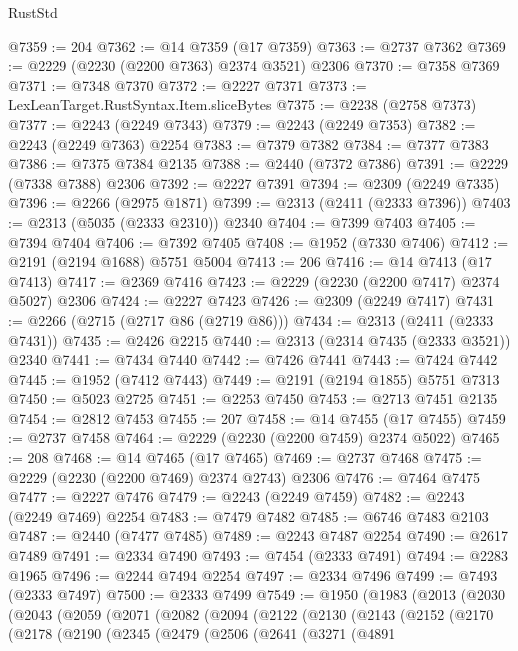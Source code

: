 \begin{lexlean}{RustStd}
\begin{coremodule}
{\begin{coremodule}
{{{{{{{{{{{{{{{{{{{{{{{{{{{{{{{{{{@7359 := 204
@7362 := @14 @7359 (@17 @7359)
@7363 := @2737 @7362
@7369 := @2229 (@2230 (@2200 @7363) @2374 @3521) @2306
@7370 := @7358 @7369
@7371 := @7348 @7370
@7372 := @2227 @7371
@7373 := LexLeanTarget.RustSyntax.Item.sliceBytes
@7375 := @2238 (@2758 @7373)
@7377 := @2243 (@2249 @7343)
@7379 := @2243 (@2249 @7353)
@7382 := @2243 (@2249 @7363) @2254
@7383 := @7379 @7382
@7384 := @7377 @7383
@7386 := @7375 @7384 @2135
@7388 := @2440 (@7372 @7386)
@7391 := @2229 (@7338 @7388) @2306
@7392 := @2227 @7391
@7394 := @2309 (@2249 @7335)
@7396 := @2266 (@2975 @1871)
@7399 := @2313 (@2411 (@2333 @7396))
@7403 := @2313 (@5035 (@2333 @2310)) @2340
@7404 := @7399 @7403
@7405 := @7394 @7404
@7406 := @7392 @7405
@7408 := @1952 (@7330 @7406)
@7412 := @2191 (@2194 @1688) @5751 @5004
@7413 := 206
@7416 := @14 @7413 (@17 @7413)
@7417 := @2369 @7416
@7423 := @2229 (@2230 (@2200 @7417) @2374 @5027) @2306
@7424 := @2227 @7423
@7426 := @2309 (@2249 @7417)
@7431 := @2266 (@2715 (@2717 @86 (@2719 @86)))
@7434 := @2313 (@2411 (@2333 @7431))
@7435 := @2426 @2215
@7440 := @2313 (@2314 @7435 (@2333 @3521)) @2340
@7441 := @7434 @7440
@7442 := @7426 @7441
@7443 := @7424 @7442
@7445 := @1952 (@7412 @7443)
@7449 := @2191 (@2194 @1855) @5751 @7313
@7450 := @5023 @2725
@7451 := @2253 @7450
@7453 := @2713 @7451 @2135
@7454 := @2812 @7453
@7455 := 207
@7458 := @14 @7455 (@17 @7455)
@7459 := @2737 @7458
@7464 := @2229 (@2230 (@2200 @7459) @2374 @5022)
@7465 := 208
@7468 := @14 @7465 (@17 @7465)
@7469 := @2737 @7468
@7475 := @2229 (@2230 (@2200 @7469) @2374 @2743) @2306
@7476 := @7464 @7475
@7477 := @2227 @7476
@7479 := @2243 (@2249 @7459)
@7482 := @2243 (@2249 @7469) @2254
@7483 := @7479 @7482
@7485 := @6746 @7483 @2103
@7487 := @2440 (@7477 @7485)
@7489 := @2243 @7487 @2254
@7490 := @2617 @7489
@7491 := @2334 @7490
@7493 := @7454 (@2333 @7491)
@7494 := @2283 @1965
@7496 := @2244 @7494 @2254
@7497 := @2334 @7496
@7499 := @7493 (@2333 @7497)
@7500 := @2333 @7499
@7549 := @1950
    (@1983
      (@2013
        (@2030
          (@2043
            (@2059
              (@2071
                (@2082
                  (@2094
                    (@2122
                      (@2130
                        (@2143
                          (@2152
                            (@2170
                              (@2178
                                (@2190
                                  (@2345
                                    (@2479
                                      (@2506
                                        (@2641
                                          (@3271
                                            (@4891
}}}}}}}}}}}}}}}}}}}}}}}}}}}}}}}}}}
\end{coremodule}}
\end{coremodule}
\end{lexlean}
